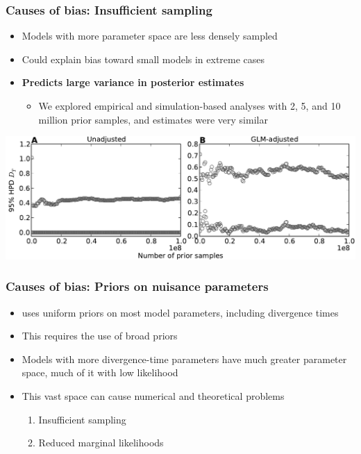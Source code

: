 \begin{frame}
    \frametitle{Causes of bias: Insufficient sampling}
    \begin{itemize}
        \item Models with more parameter space are less densely sampled
        \item Could explain bias toward small models in extreme cases
        \item {\bf Predicts large variance in posterior estimates}
        \begin{itemize}
            \item We explored empirical and simulation-based analyses with
                2, 5, and 10 million prior samples, and estimates were
                very similar
        \end{itemize}
    \end{itemize}
    \smallskip
    \centerline{
    \includegraphics[width=\textwidth]{images/omega_over_sampling.pdf}}
\end{frame}

\begin{frame}
    \frametitle{Causes of bias: Priors on nuisance parameters}
    \begin{itemize}
        \item \msb uses uniform priors on most model parameters, including
            divergence times
        \item This requires the use of broad priors
        \item Models with more divergence-time parameters have much greater
            parameter space, much of it with low likelihood
        \item This vast space can cause numerical and theoretical problems
        \begin{enumerate}
            \item Insufficient sampling
            \item Reduced marginal likelihoods
        \end{enumerate}
    \end{itemize}
\end{frame}

